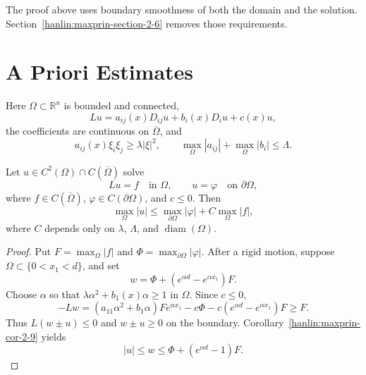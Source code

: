 \begin{remark}\label{hanlin:maxprin-remark-2-23}
The proof above uses boundary smoothness of both the domain and the solution.
Section~\ref{hanlin:maxprin-section-2-6} removes those requirements.
\end{remark}

\section{A Priori Estimates}\label{hanlin:maxprin-section-2-3}

Here $\Omega\subset\mathbb R^n$ is bounded and connected,
\[
Lu=a_{ij}(x)D_{ij}u+b_i(x)D_iu+c(x)u,
\]
the coefficients are continuous on $\overline\Omega$, and
\[
a_{ij}(x)\xi_i\xi_j\ge\lambda|\xi|^2,
\qquad
\max_\Omega|a_{ij}|+\max_\Omega|b_i|\le\Lambda.
\]

\begin{theorem}\label{hanlin:maxprin-theorem-2-24}
Let $u\in C^2(\Omega)\cap C(\overline\Omega)$ solve
\[
Lu=f\quad\text{in }\Omega,
\qquad
u=\varphi\quad\text{on }\partial\Omega,
\]
where $f\in C(\overline\Omega)$, $\varphi\in C(\partial\Omega)$, and $c\le0$.
Then
\[
\max_\Omega|u|\le\max_{\partial\Omega}|\varphi|+C\max_\Omega|f|,
\]
where $C$ depends only on $\lambda$, $\Lambda$, and
$\operatorname{diam}(\Omega)$.
\end{theorem}
\begin{proof}
\sketch Put $F=\max_\Omega|f|$ and
$\Phi=\max_{\partial\Omega}|\varphi|$. After a rigid motion, suppose
$\Omega\subset\{0<x_1<d\}$, and set
\[
w=\Phi+(e^{\alpha d}-e^{\alpha x_1})F.
\]
Choose $\alpha$ so that $\lambda\alpha^2+b_1(x)\alpha\ge1$ in $\Omega$.
Since $c\le0$,
\[
-Lw=(a_{11}\alpha^2+b_1\alpha)Fe^{\alpha x_1}
-c\Phi-c(e^{\alpha d}-e^{\alpha x_1})F\ge F.
\]
Thus $L(w\pm u)\le0$ and $w\pm u\ge0$ on the boundary.
Corollary~\ref{hanlin:maxprin-cor-2-9} yields
\[
|u|\le w\le\Phi+(e^{\alpha d}-1)F.
\]
\end{proof}

